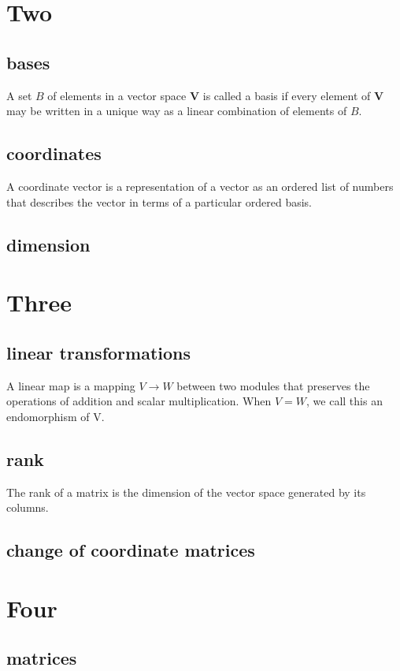 \documentclass[11pt]{article}
\begin{document}
\newpage

\section{Two}
\subsection{bases}
A set $B$ of elements in a vector space  $\textbf{V}$ is called a basis if every element of $\textbf{V}$ may be written in a unique way as a linear combination of elements of $B$.
\subsection{coordinates}
A coordinate vector is a representation of a vector as an ordered list of numbers that describes the vector in terms of a particular
ordered basis.
\subsection{dimension}

\newpage

\section{Three}
\subsection{linear transformations}
A linear map is a mapping $V \to W$ between two modules that preserves the operations of addition and scalar multiplication.
When $V = W$, we call this an endomorphism of V.
\subsection{rank}
The rank of a matrix is the dimension of the vector space generated by its columns.
\subsection{change of coordinate matrices}

\newpage

\section{Four}
\subsection{matrices}
\end{document}
